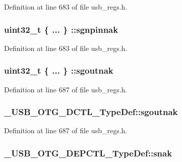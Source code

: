Definition at line 683 of file usb\-\_\-regs.\-h.

\hypertarget{group___u_s_b___o_t_g___d_r_i_v_e_r_ga5d34038f1ad6ce437f7d9fa6d09a2e3e}{
\subsubsection[{sgnpinnak}]{\setlength{\rightskip}{0pt plus 5cm}uint32\-\_\-t \{ ... \} \-::sgnpinnak}}\label{group___u_s_b___o_t_g___d_r_i_v_e_r_ga5d34038f1ad6ce437f7d9fa6d09a2e3e}


Definition at line 683 of file usb\-\_\-regs.\-h.

\hypertarget{group___u_s_b___o_t_g___d_r_i_v_e_r_ga5023f929846f8b698597baaa9fcfd724}{
\subsubsection[{sgoutnak}]{\setlength{\rightskip}{0pt plus 5cm}uint32\-\_\-t \{ ... \} \-::sgoutnak}}\label{group___u_s_b___o_t_g___d_r_i_v_e_r_ga5023f929846f8b698597baaa9fcfd724}


Definition at line 687 of file usb\-\_\-regs.\-h.

\hypertarget{group___u_s_b___o_t_g___d_r_i_v_e_r_ga1f7b8be5eec6ec007263d62310d0a463}{
\subsubsection[{sgoutnak}]{ \-\_\-\-U\-S\-B\-\_\-\-O\-T\-G\-\_\-\-D\-C\-T\-L\-\_\-\-Type\-Def\-::sgoutnak}}\label{group___u_s_b___o_t_g___d_r_i_v_e_r_ga1f7b8be5eec6ec007263d62310d0a463}


Definition at line 687 of file usb\-\_\-regs.\-h.

\hypertarget{group___u_s_b___o_t_g___d_r_i_v_e_r_ga12a5b369b36732e560b814f77a5b4f28}{
\subsubsection[{snak}]{ \-\_\-\-U\-S\-B\-\_\-\-O\-T\-G\-\_\-\-D\-E\-P\-C\-T\-L\-\_\-\-Type\-Def\-::snak}}\label{group___u_s_b___o_t_g___d_r_i_v_e_r_ga12a5b369b36732e560b814f77a5b4f28}


